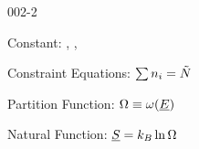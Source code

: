 \begin{mitframe}{002-2} %

    
\begin{listone}
    
    \item Constant: \nummoles, \uline{\vol}, \uline{\energy}
    
    \item Constraint Equations: $\sum\nolimits \molspecies{i} = \totmoles$ 
    
           
    \item Partition Function: $\mpc \equiv \mpf(\uline{\energy})$
    
    
           
    \item Natural Function: $\uline{\entropy} = \boltz\ln\mpc$
    
    
    
\end{listone}			

\end{mitframe}